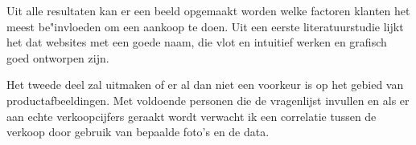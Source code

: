 
Uit alle resultaten kan er een beeld opgemaakt worden welke factoren klanten het meest be"invloeden om een aankoop te doen. Uit een eerste literatuurstudie lijkt het dat websites met een goede naam, die vlot en intuitief werken en grafisch goed ontworpen zijn. 

Het tweede deel zal uitmaken of er al dan niet een voorkeur is op het gebied van productafbeeldingen. Met voldoende personen die de vragenlijst invullen en als er aan echte verkoopcijfers geraakt wordt verwacht ik een correlatie tussen de verkoop door gebruik van bepaalde foto's en de data.